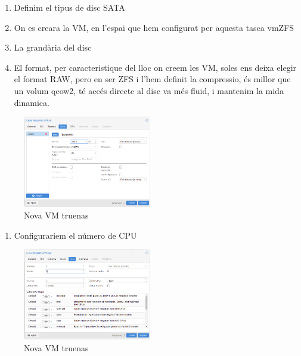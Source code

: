 \documentclass[
  10pt,
]{krantz}
\providecommand{\tightlist}{%
  \setlength{\itemsep}{0pt}\setlength{\parskip}{0pt}}
\begin{document}
\begin{enumerate}
\def\labelenumi{\arabic{enumi}.}
\setcounter{enumi}{8}
\tightlist
\item
  Definim el tipus de disc SATA
\item
  On es creara la VM, en l'espai que hem configurat per aquesta tasca vmZFS
\item
  La grandària del disc
\item
  El format, per caracteristique del lloc on creem les VM, soles ens deixa elegir el format RAW, pero en ser ZFS i l'hem definit la compressio, és millor que un volum qcow2, té accés directe al disc va més fluid, i mantenim la mida dinamica.
\end{enumerate}

\begin{figure}
\centering
\includegraphics[width=0.5\textwidth,height=\textheight]{imatges/proxmox/install_truenas4.png}
\caption{Nova VM truenas}
\end{figure}

\begin{enumerate}
\def\labelenumi{\arabic{enumi}.}
\setcounter{enumi}{12}
\tightlist
\item
  Configurariem el número de CPU
\end{enumerate}

\begin{figure}
\centering
\includegraphics[width=0.5\textwidth,height=\textheight]{imatges/proxmox/install_truenas5.png}
\caption{Nova VM truenas}
\end{figure}
\end{document}
